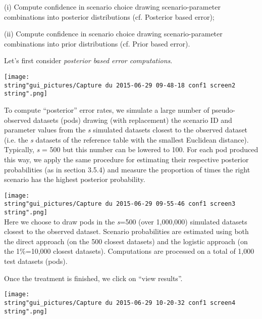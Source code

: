 (i) Compute confidence in scenario choice drawing scenario-parameter
combinations into posterior distributions (cf. Posterior based error);

(ii) Compute confidence in scenario choice drawing scenario-parameter
combinations into prior distributions (cf. Prior based error).

Let's first consider \textit{posterior based error computations}.

\texttt{[image: \\string"gui\_pictures/Capture du 2015-06-29 09-48-18 conf1 screen2\\string".png]}

To compute \textquotedblleft{}posterior\textquotedblright{} error
rates, we simulate a large number of pseudo-observed datasets (pods)
drawing (with replacement) the scenario ID and parameter values from
the \textit{s} simulated datasets closest to the observed dataset
(i.e. the \textit{s} datasets of the reference table with the smallest
Euclidean distance). Typically, \textit{s }= 500 but this number can
be lowered to 100. For each pod produced this way, we apply the same
procedure for estimating their respective posterior probabilities
(as in section 3.5.4) and measure the proportion of times the right
scenario has the highest posterior probability.

\texttt{[image: \\string"gui\_pictures/Capture du 2015-06-29 09-55-46 conf1 screen3\\string".png]}\\
Here we choose to draw pods in the \textit{s}=500 (over 1,000,000)
simulated datasets closest to the observed dataset. Scenario probabilities
are estimated using both the direct approach (on the 500 closest datasets)
and the logistic approach (on the 1\%=10,000 closest datasets). Computations
are processed on a total of 1,000 test datasets (pods).

Once the treatment is finished, we click on ``view results''.

\texttt{[image: \\string"gui\_pictures/Capture du 2015-06-29 10-20-32 conf1 screen4\\string".png]}

